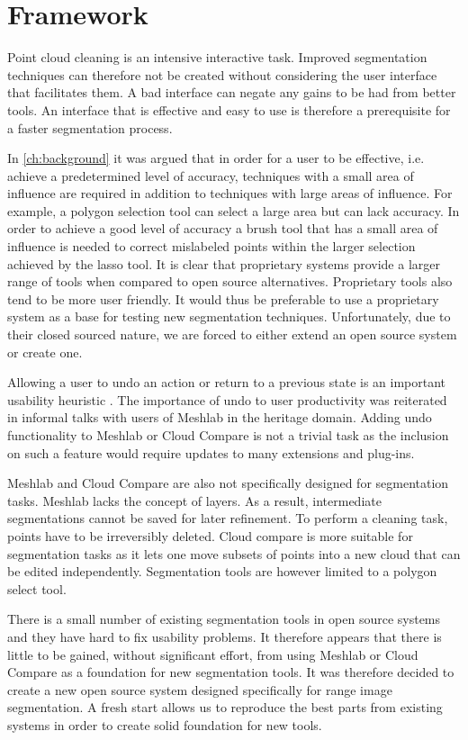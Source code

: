 \chapter{Framework} \label{chapter:framework}
Point cloud cleaning is an intensive interactive task. Improved segmentation techniques can therefore not be created without considering the user interface that facilitates them. A bad interface can negate any gains to be had from better tools. An interface that is effective and easy to use is therefore a prerequisite for a faster segmentation process.

In \autoref{ch:background} it was argued that in order for a user to be effective, i.e. achieve a predetermined level of accuracy, techniques with a small area of influence are required in addition to techniques with large areas of influence. For example, a polygon selection tool can select a large area but can lack accuracy. In order to achieve a good level of accuracy a brush tool that has a small area of influence is needed to correct mislabeled points within the larger selection achieved by the lasso tool. It is clear that proprietary systems provide a larger range of tools when compared to open source alternatives. Proprietary tools also tend to be more user friendly. It would thus be preferable to use a proprietary system as a base for testing new segmentation techniques. Unfortunately, due to their closed sourced nature, we are forced to either extend an open source system or create one.

Allowing a user to undo an action or return to a previous state is an important usability heuristic \cite{Nielsen2005}. The importance of undo to user productivity was reiterated in informal talks with users of Meshlab in the heritage domain. Adding undo functionality to Meshlab or Cloud Compare is not a trivial task as the inclusion on such a feature would require updates to many extensions and plug-ins.

Meshlab and Cloud Compare are also not specifically designed for segmentation tasks. Meshlab lacks the concept of layers. As a result, intermediate segmentations cannot be saved for later refinement. To perform a cleaning task, points have to be irreversibly deleted. Cloud compare is more suitable for segmentation tasks as it lets one move subsets of points into a new cloud that can be edited independently. Segmentation tools are however limited to a polygon select tool.

There is a small number of existing segmentation tools in open source systems and they have hard to fix usability problems. It therefore appears that there is little to be gained, without significant effort, from using Meshlab or Cloud Compare as a foundation for new segmentation tools. It was therefore decided to create a new open source system designed specifically for range image segmentation. A fresh start allows us to reproduce the best parts from existing systems in order to create solid foundation for new tools.

